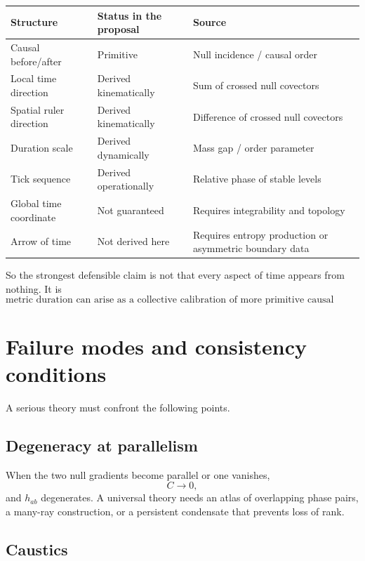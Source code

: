 \documentclass[11pt,a4paper]{article}
\newcommand{\Ccross}{C}
\begin{document}
\begin{center}
\begin{tabular}{>{\raggedright\arraybackslash}p{} >{\raggedright\arraybackslash}p{} >{\raggedright\arraybackslash}p{}}
\toprule
Structure & Status in the proposal & Source \\
\midrule
Causal before/after & Primitive & Null incidence / causal order \\
Local time direction & Derived kinematically & Sum of crossed null covectors \\
Spatial ruler direction & Derived kinematically & Difference of crossed null covectors \\
Duration scale & Derived dynamically & Mass gap / order parameter \\
Tick sequence & Derived operationally & Relative phase of stable levels \\
Global time coordinate & Not guaranteed & Requires integrability and topology \\
Arrow of time & Not derived here & Requires entropy production or asymmetric boundary data \\
\bottomrule
\end{tabular}
\end{center}

So the strongest defensible claim is not that every aspect of time appears from nothing. It is
\[
\boxed{
\text{metric duration can arise as a collective calibration of more primitive causal relations.}
}
\]

\section{Failure modes and consistency conditions}

A serious theory must confront the following points.

\subsection{Degeneracy at parallelism}

When the two null gradients become parallel or one vanishes,
\[
\Ccross\rightarrow0,
\]
and $h_{ab}$ degenerates. A universal theory needs an atlas of overlapping phase pairs, a many-ray construction, or a persistent condensate that prevents loss of rank.

\subsection{Caustics}
\end{document}
